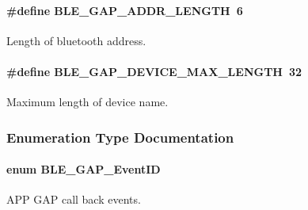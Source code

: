 \paragraph[{\texorpdfstring{B\+L\+E\+\_\+\+G\+A\+P\+\_\+\+A\+D\+D\+R\+\_\+\+L\+E\+N\+G\+TH}{BLE_GAP_ADDR_LENGTH}}]{\setlength{\rightskip}{0pt plus 5cm}\#define B\+L\+E\+\_\+\+G\+A\+P\+\_\+\+A\+D\+D\+R\+\_\+\+L\+E\+N\+G\+TH~6}\hypertarget{group___b_l_e___g_a_p_gac59af0a1a5d256432e9d01cdcd35215d}{}\label{group___b_l_e___g_a_p_gac59af0a1a5d256432e9d01cdcd35215d}
Length of bluetooth address. 
\paragraph[{\texorpdfstring{B\+L\+E\+\_\+\+G\+A\+P\+\_\+\+D\+E\+V\+I\+C\+E\+\_\+\+M\+A\+X\+\_\+\+L\+E\+N\+G\+TH}{BLE_GAP_DEVICE_MAX_LENGTH}}]{\setlength{\rightskip}{0pt plus 5cm}\#define B\+L\+E\+\_\+\+G\+A\+P\+\_\+\+D\+E\+V\+I\+C\+E\+\_\+\+M\+A\+X\+\_\+\+L\+E\+N\+G\+TH~32}\hypertarget{group___b_l_e___g_a_p_ga78a44d2d04cdb689a4168c32c0657222}{}\label{group___b_l_e___g_a_p_ga78a44d2d04cdb689a4168c32c0657222}
Maximum length of device name. 

\subsubsection{Enumeration Type Documentation}
\paragraph[{\texorpdfstring{B\+L\+E\+\_\+\+G\+A\+P\+\_\+\+Event\+ID}{BLE_GAP_EventID}}]{\setlength{\rightskip}{0pt plus 5cm}enum {\bf B\+L\+E\+\_\+\+G\+A\+P\+\_\+\+Event\+ID}}\hypertarget{group___b_l_e___g_a_p_gab40cc5a5c434d2d7d9cb7c22634f7b61}{}\label{group___b_l_e___g_a_p_gab40cc5a5c434d2d7d9cb7c22634f7b61}


A\+PP G\+AP call back events. 

